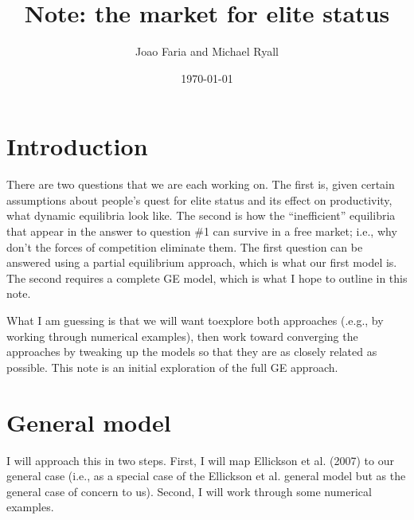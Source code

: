 \documentclass[12pt,letterpaper]{article}
\title{Note: the market for elite status}
\author{Joao Faria and Michael Ryall}
\date{\today}
\begin{document}
	
	\maketitle
	
	
	\onehalfspacing
	
	\section{Introduction}
	There are two questions that we are each working on. 
	The first is, given certain assumptions about people's quest for elite status and its effect on productivity, what dynamic equilibria look like.
	The second is how the ``inefficient'' equilibria that appear in the answer to question \#1 can survive in a free market; i.e., why don't the forces of competition eliminate them.
	The first question can be answered using a partial equilibrium approach, which is what our first model is.
	The second requires a complete GE model, which is what I hope to outline in this note.
	
	What I am guessing is that we will want toexplore both approaches (.e.g., by working through numerical examples), then work toward converging the approaches by tweaking up the models so that they are as closely related as possible. 
	This note is an initial exploration of the full GE approach.
%	


	
	\section{General model}
	I will approach this in two steps. 
	First, I will map Ellickson et al. (2007) to our  general case (i.e., as a special case of the Ellickson et al. general model but as the general case of concern to us).
	Second, I will work through some numerical examples.
	
\end{document}
